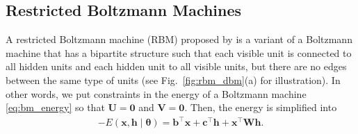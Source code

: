 \documentclass[dissertation,nocontribution]{aaltoseries}
\newcommand{\vect}[1]{\mathbf{#1}}
\newcommand{\vects}[1]{\boldsymbol{#1}}
\newcommand{\matr}[1]{\mathbf{#1}}
\newcommand{\vb}[0]{\vect{b}}
\newcommand{\vc}[0]{\vect{c}}
\newcommand{\vh}[0]{\vect{h}}
\newcommand{\vx}[0]{\vect{x}}
\newcommand{\mW}[0]{\matr{W}}
\newcommand{\mU}[0]{\matr{U}}
\newcommand{\mV}[0]{\matr{V}}
\newcommand{\mzero}[0]{\matr{0}}
\newcommand{\TT}[0]{{\vects{\theta}}}
\begin{document}
\subsection{Restricted Boltzmann Machines}
\label{sec:rbm}

A restricted Boltzmann machine (RBM) proposed by
\citet{Smolensky1986} is a variant of a Boltzmann machine
that has a bipartite structure such that each visible unit
is connected to all hidden units and each hidden unit to all
visible units, but there are no edges between the same type of units
(see Fig.~\ref{fig:rbm_dbm}(a) for illustration). In other
words, we put constraints in the energy of a Boltzmann
machine \eqref{eq:bm_energy} so that $\mU = \mzero$ and $\mV =
\mzero$.  Then, the energy is simplified into 
\begin{align}
    \label{eq:rbm_energy}
    -E(\vx, \vh \mid \TT) = \vb^\top \vx + \vc^\top \vh +
    \vx^\top \mW \vh.
\end{align}
\end{document}

